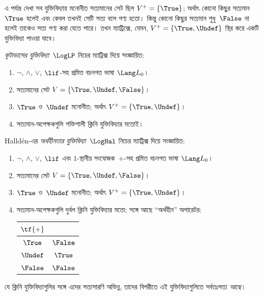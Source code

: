 \documentclass[../../../include/open-logic-section]{subfiles}
\begin{document}


এ পর্যন্ত দেখা সব যুক্তিবিদ্যায় মনোনীত সত্যমানের সেট ছিল
$V^+ = \{\True\}$; অর্থাৎ কোনো কিছুর সত্যমান~$\True$ হলেই এবং কেবল
তখনই সেটি সত্য বলে গণ্য হতো। কিন্তু কোনো কিছুর সত্যমান শুধু~$\False$
না হলেই তাকেও সত্য গণ্য করা যেতে পারে। তখন ম্যাট্রিক্সে, যেমন,
$V^+ = \{\True, \Undef\}$ স্থির করে একটি যুক্তিবিদ্যা পাওয়া যাবে।

\begin{defn}
\emph{কূটাভাসের যুক্তিবিদ্যা}~$\LogLP$ নিচের ম্যাট্রিক্স দিয়ে সংজ্ঞায়িত:
\begin{enumerate}
  \item $\lnot$, $\land$, $\lor$, $\lif$-সহ প্রমিত বচনগত ভাষা
  $\Lang L_0$।
  \item সত্যমানের সেট $V = \{\True, \Undef, \False\}$।
  \item $\True$ ও~$\Undef$ মনোনীত; অর্থাৎ
  $V^+ = \{\True, \Undef\}$।
  \item সত্যমান-অপেক্ষকগুলি শক্তিশালী ক্লিনি যুক্তিবিদ্যার মতোই।
\end{enumerate}
\end{defn}

\begin{defn}
Halld\'en-এর \emph{অর্থহীনতার যুক্তিবিদ্যা}~$\LogHal$ নিচের ম্যাট্রিক্স
দিয়ে সংজ্ঞায়িত:
\begin{enumerate}
  \item $\lnot$, $\land$, $\lor$, $\lif$ এবং $1$-স্থানীয় সংযোজক~$+$-সহ
  প্রমিত বচনগত ভাষা $\Lang L_0$।
  \item সত্যমানের সেট $V = \{\True, \Undef, \False\}$।
  \item $\True$ ও~$\Undef$ মনোনীত; অর্থাৎ
  $V^+ = \{\True, \Undef\}$।
  \item সত্যমান-অপেক্ষকগুলি দুর্বল ক্লিনি যুক্তিবিদ্যার মতো; সঙ্গে আছে
  “অর্থহীন” অপারেটর:
  \begin{center}
    \begin{tabular}{c|c}
    $\tf{+}$ & \\
    \hline
    $\True$ & $\False$ \\
    $\Undef$ & $\True$ \\
    $\False$ & $\False$
    \end{tabular}
  \end{center}
\end{enumerate}
\end{defn}

যে ক্লিনি যুক্তিবিদ্যাগুলির সঙ্গে এদের সত্যসারণি অভিন্ন, তাদের বিপরীতে
এই যুক্তিবিদ্যাগুলিতে সর্বতঃসত্য \emph{আছে}।
\end{document}
